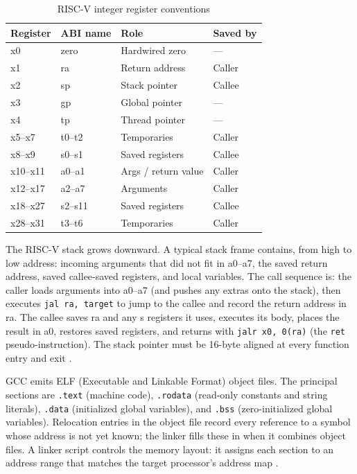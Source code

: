 \begin{table}[htb]
\centering
\caption{RISC-V integer register conventions \cite{riscv-psabi}}
\label{tab:riscv-registers}
\begin{tabular}{llll}
\toprule
\textbf{Register} & \textbf{ABI name} & \textbf{Role} & \textbf{Saved by} \\
\midrule
x0        & zero    & Hardwired zero       & --- \\
x1        & ra      & Return address       & Caller \\
x2        & sp      & Stack pointer        & Callee \\
x3        & gp      & Global pointer       & --- \\
x4        & tp      & Thread pointer       & --- \\
x5--x7    & t0--t2  & Temporaries          & Caller \\
x8--x9    & s0--s1  & Saved registers      & Callee \\
x10--x11  & a0--a1  & Args / return value  & Caller \\
x12--x17  & a2--a7  & Arguments            & Caller \\
x18--x27  & s2--s11 & Saved registers      & Callee \\
x28--x31  & t3--t6  & Temporaries          & Caller \\
\bottomrule
\end{tabular}
\end{table}

The RISC-V stack grows downward. A typical stack frame contains, from high to low address: incoming
arguments that did not fit in a0--a7, the saved return address, saved callee-saved registers, and local
variables. The call sequence is: the caller loads arguments into a0--a7 (and pushes any extras onto
the stack), then executes \texttt{jal ra, target} to jump to the callee and record the return address
in ra. The callee saves ra and any s registers it uses, executes its body, places the result in a0,
restores saved registers, and returns with \texttt{jalr x0, 0(ra)} (the \texttt{ret}
pseudo-instruction). The stack pointer must be 16-byte aligned at every function entry and exit
\cite{riscv-psabi}.

GCC emits ELF (Executable and Linkable Format) object files. The principal sections are \texttt{.text}
(machine code), \texttt{.rodata} (read-only constants and string literals), \texttt{.data} (initialized
global variables), and \texttt{.bss} (zero-initialized global variables). Relocation entries in the
object file record every reference to a symbol whose address is not yet known; the linker fills these
in when it combines object files. A linker script controls the memory layout: it assigns each section
to an address range that matches the target processor's address map \cite{riscv-psabi}.

